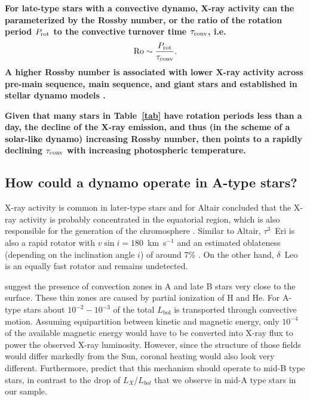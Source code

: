 \documentclass[preprint2]{aastex631}
\begin{document}
\textbf{For late-type stars with a convective dynamo, X-ray activity can the parameterized by the Rossby number, or the ratio of the rotation period $P_{\rm rot}$ to the convective turnover time $\tau_{\rm conv}$, i.e.
\begin{equation}
{\rm Ro} \sim \frac{P_{\rm rot}}{\tau_{\rm conv}}. \label{eqn:ro}
\end{equation}
A higher Rossby number is associated with lower X-ray activity across pre-main sequence, main sequence, and giant stars \citep{Preibisch+2005, Pizzolato+2003, Gondoin+2005,2011ApJ...743...48W} and established in stellar dynamo models \citep[e.g.][]{Brandenburg+1998}.}

\textbf{Given that many stars in Table~\ref{tab} have rotation periods less than a day, the decline of the X-ray emission, and thus (in the scheme of a solar-like dynamo) increasing Rossby number, then points to a rapidly declining $\tau_{\rm conv}$ with increasing photospheric temperature.} 


\subsection{How could a dynamo operate in A-type stars?}
\label{sect:dynamos}

X-ray activity is common in later-type stars and for Altair
\citet{2009A&A...497..511R} concluded that the X-ray activity is
probably concentrated in the equatorial region, which is also
responsible for the generation of the chromosphere
\citep{1995ApJ...439.1011F}. Similar to Altair, $\tau^3$~Eri is also a
rapid rotator with $v\sin i=180$~km~s$^{-1}$ and an estimated oblateness
(depending on the inclination angle $i$) of around 7\%
\citep{2012A&ARv..20...51V}. On the other hand, $\delta$~Leo is an
equally fast rotator and remains undetected.

\citet{2019ApJ...883..106C} suggest the presence of 
convection zones in A and late B stars very close to the surface. These thin zones are caused
by partial ionization of H and He. For A-type stars about $10^{-2}-10^{-3}$ of the total $L_\mathrm{bol}$ is transported through convective motion. Assuming equipartition between kinetic and magnetic energy, only $10^{-4}$ of the available magnetic energy would have to be converted into X-ray flux to power the observed X-ray luminosity. However, since the structure of those fields would differ markedly from the Sun, coronal heating would also look very different. Furthermore, \citet{2019ApJ...883..106C} predict that this mechanism should operate to mid-B type stars, in contrast to the drop of $L_X$/$L_{bol}$ that we observe in mid-A type stars in our sample.
\end{document}
